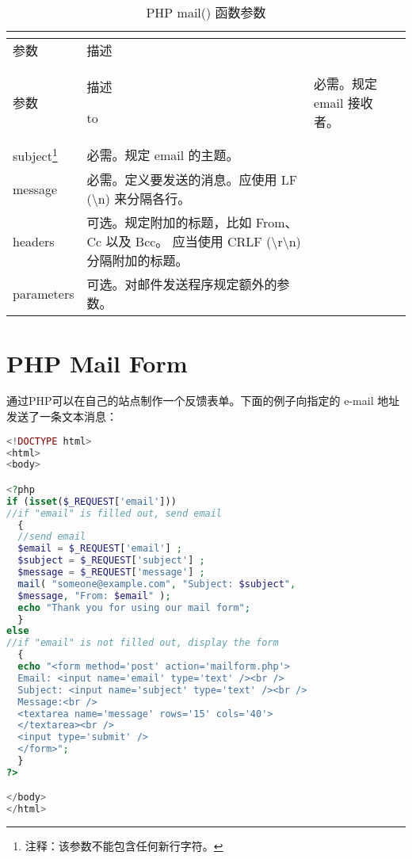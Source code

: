\begin{longtable}{|m{100pt}|m{280pt}|}
\tabularnewline\hline
参数	&描述
\endhead

\caption{PHP mail() 函数参数}\\
\hline
参数	&描述
\endfirsthead

\endfoot

\endlastfoot
\hline
to			&必需。规定 email 接收者。\\
\hline
subject\footnote{注释：该参数不能包含任何新行字符。}		&必需。规定 email 的主题。\\
\hline
message	&必需。定义要发送的消息。应使用 LF ({\textbackslash}n) 来分隔各行。\\
\hline
headers		&可选。规定附加的标题，比如 From、Cc 以及 Bcc。
			\newline 应当使用 CRLF ({\textbackslash}r{\textbackslash}n) 分隔附加的标题。\\
\hline
parameters	&可选。对邮件发送程序规定额外的参数。\\
\hline
\end{longtable}
















\section{PHP Mail Form}


通过PHP可以在自己的站点制作一个反馈表单。下面的例子向指定的 e-mail 地址发送了一条文本消息：

\begin{lstlisting}[language=PHP]
<!DOCTYPE html>
<html>
<body>

<?php
if (isset($_REQUEST['email']))
//if "email" is filled out, send email
  {
  //send email
  $email = $_REQUEST['email'] ; 
  $subject = $_REQUEST['subject'] ;
  $message = $_REQUEST['message'] ;
  mail( "someone@example.com", "Subject: $subject",
  $message, "From: $email" );
  echo "Thank you for using our mail form";
  }
else
//if "email" is not filled out, display the form
  {
  echo "<form method='post' action='mailform.php'>
  Email: <input name='email' type='text' /><br />
  Subject: <input name='subject' type='text' /><br />
  Message:<br />
  <textarea name='message' rows='15' cols='40'>
  </textarea><br />
  <input type='submit' />
  </form>";
  }
?>

</body>
</html>
\end{lstlisting}


